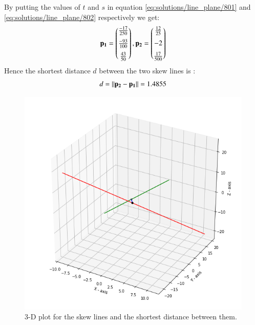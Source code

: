 By putting the values of $t$ and $s$ in equation \eqref{eq:solutions/line_plane/801} and \eqref{eq:solutions/line_plane/802} respectively we get:
\begin{align}
    \mathbf{p_1}=\begin{pmatrix}\frac{-17}{250}\\[0.2cm]\frac{-93}{100}\\[0.2cm]\frac{43}{50}\end{pmatrix},\mathbf{p_2}=\begin{pmatrix}\frac{12}{25}\\[0.2cm]-2\\[0.2cm]\frac{17}{500}\end{pmatrix}
\end{align}
Hence the shortest distance $d$ between the two skew lines is :
\begin{align}
d=\left\lVert\mathbf{p_2}-\mathbf{p_1}\right\rVert=1.4855
\end{align}
\begin{figure}[h]
\centering
    \includegraphics[width=\columnwidth]{./solutions/line_plane/80/assignment2.png}
    \caption{3-D plot for the skew lines and the shortest distance between them.}
    \label{skew_lines:solutions/line_plane/80}
\end{figure}

